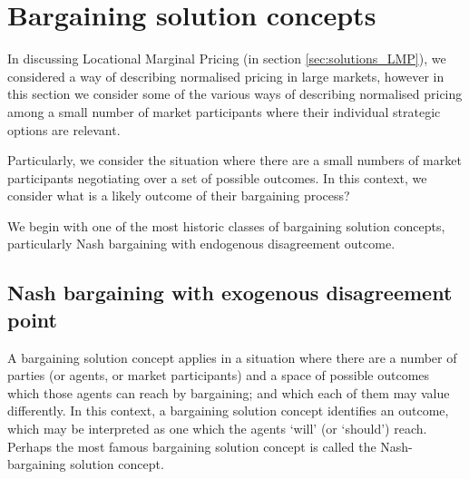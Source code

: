 \section{Bargaining solution concepts}\label{sec:solutions_bargaining}

In discussing Locational Marginal Pricing (in section \ref{sec:solutions_LMP}), we considered a way of describing normalised pricing in large markets, however in this section we consider some of the various ways of describing normalised pricing among a small number of market participants where their individual strategic options are relevant.

Particularly, we consider the situation where there are a small numbers of market participants negotiating over a set of possible outcomes.
In this context, we consider what is a likely outcome of their bargaining process?


We begin with one of the most historic classes of bargaining solution concepts, particularly Nash bargaining with endogenous disagreement outcome.

\subsection{Nash bargaining with exogenous disagreement point}\label{sec:nash_bargaining_exogenous}




A bargaining solution concept applies in a situation where there are a number of parties (or agents, or market participants) and a space of possible outcomes which those agents can reach by bargaining; and which each of them may value differently.
In this context, a bargaining solution concept identifies an outcome, which may be interpreted as one which the agents `will' (or `should') reach.
Perhaps the most famous bargaining solution concept is called the Nash-bargaining solution concept.

